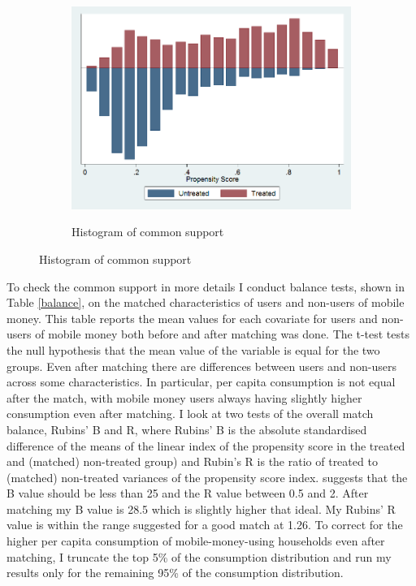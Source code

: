 \begin{figure}[h]
\centering
\caption{Histograms of common support}
\begin{subfigure}[h]{0.4\textwidth}
\caption{Histogram of common support }
\includegraphics[width=\textwidth,trim= 0.5cm 0cm 0.5cm 0.5cm, clip=true, keepaspectratio]{common_support} \label{common_support}
\end{subfigure}

\end{figure}

To check the common support in more details I conduct balance tests, shown in Table \ref{balance}, on the matched characteristics of users and non-users of mobile money. This table reports the mean values for each covariate for users and non-users of mobile money both before and after matching was done. The t-test tests the null hypothesis that the mean value of the variable is equal for the two groups. Even after matching there are differences between users and non-users across some characteristics. In particular, per capita consumption is not equal after the match, with mobile money users always having slightly higher consumption even after matching. I look at two tests of the overall match balance, Rubins' B and R, where Rubins' B is the absolute standardised difference of the means of the linear index of the propensity score in the treated and (matched) non-treated group) and Rubin's R is the ratio of treated to (matched) non-treated variances of the propensity score index. \cite{rubin2001} suggests that the B value should be less than 25 and the R value between 0.5 and 2. After matching my B value is  28.5 which is slightly higher that ideal. My Rubins' R value is within the range suggested for a good match at 1.26. To correct for the higher per capita consumption of mobile-money-using households even after matching, I truncate the top 5\% of the consumption distribution and run my results only for the remaining 95\% of the consumption distribution. 




\clearpage
